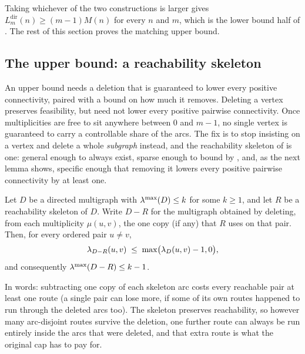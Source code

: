 Taking whichever of the two constructions is larger gives $L_m^{\mathrm{dir}}(n) \ge (m-1)M(n)$ for every $n$ and $m$, which is the lower bound half of . The rest of this section proves the matching upper bound.

\subsection{The upper bound: a reachability skeleton}

An upper bound needs a deletion that is guaranteed to lower every positive connectivity, paired with a bound on how much it removes. Deleting a vertex preserves feasibility, but need not lower every positive pairwise connectivity. Once multiplicities are free to sit anywhere between $0$ and $m-1$, no single vertex is guaranteed to carry a controllable share of the arcs. The fix is to stop insisting on a vertex and delete a whole \emph{subgraph} instead, and the reachability skeleton of  is one: general enough to always exist, sparse enough to bound by , and, as the next lemma shows, specific enough that removing it lowers every positive pairwise connectivity by at least one.


\begin{lemma}\label{lem:reach-delete}
Let $D$ be a directed multigraph with $\lambda^{\max}(D) \le k$ for some $k \ge 1$, and let $R$ be a reachability skeleton of $D$. Write $D - R$ for the multigraph obtained by deleting, from each multiplicity $\mu(u,v)$, the one copy (if any) that $R$ uses on that pair. Then, for every ordered pair $u \ne v$,
\[
    \lambda_{D-R}(u,v) \;\le\; \max\bigl(\lambda_D(u,v)-1,0\bigr),
\]
and consequently $\lambda^{\max}(D - R) \le k - 1$.
\end{lemma}

In words: subtracting one copy of each skeleton arc costs every reachable pair at least one route (a single pair can lose more, if some of its own routes happened to run through the deleted arcs too). The skeleton preserves reachability, so however many arc-disjoint routes survive the deletion, one further route can always be run entirely inside the arcs that were deleted, and that extra route is what the original cap has to pay for.

